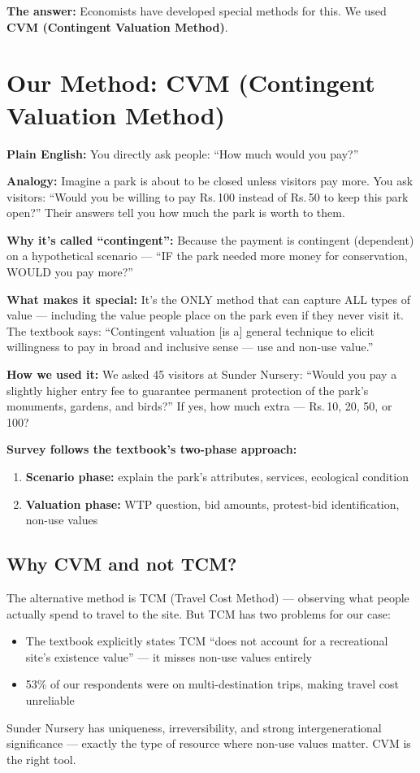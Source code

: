 \documentclass[11pt, a4paper]{article}
\newcommand{\rupee}{Rs.\,}
\begin{document}
\textbf{The answer:} Economists have developed special methods for this. We used \textbf{CVM (Contingent Valuation Method)}.

\section{Our Method: CVM (Contingent Valuation Method)}

\textbf{Plain English:} You directly ask people: ``How much would you pay?''

\textbf{Analogy:} Imagine a park is about to be closed unless visitors pay more. You ask visitors: ``Would you be willing to pay \rupee 100 instead of \rupee 50 to keep this park open?'' Their answers tell you how much the park is worth to them.

\textbf{Why it's called ``contingent'':} Because the payment is contingent (dependent) on a hypothetical scenario --- ``IF the park needed more money for conservation, WOULD you pay more?''

\textbf{What makes it special:} It's the ONLY method that can capture ALL types of value --- including the value people place on the park even if they never visit it. The textbook says: ``Contingent valuation [is a] general technique to elicit willingness to pay in broad and inclusive sense --- use and non-use value.''

\textbf{How we used it:} We asked 45 visitors at Sunder Nursery: ``Would you pay a slightly higher entry fee to guarantee permanent protection of the park's monuments, gardens, and birds?'' If yes, how much extra --- \rupee 10, 20, 50, or 100?

\textbf{Survey follows the textbook's two-phase approach:}
\begin{enumerate}[nosep]
    \item \textbf{Scenario phase:} explain the park's attributes, services, ecological condition
    \item \textbf{Valuation phase:} WTP question, bid amounts, protest-bid identification, non-use values
\end{enumerate}

\subsection{Why CVM and not TCM?}

The alternative method is TCM (Travel Cost Method) --- observing what people actually spend to travel to the site. But TCM has two problems for our case:
\begin{itemize}[nosep]
    \item The textbook explicitly states TCM ``does not account for a recreational site's existence value'' --- it misses non-use values entirely
    \item 53\% of our respondents were on multi-destination trips, making travel cost unreliable
\end{itemize}
Sunder Nursery has uniqueness, irreversibility, and strong intergenerational significance --- exactly the type of resource where non-use values matter. CVM is the right tool.
\end{document}
